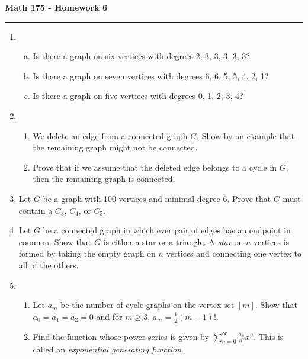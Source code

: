 \documentclass[11pt,letterpaper]{report}
\begin{document}
\begin{center}
{\bf \Large Math 175 - Homework 6}
\vspace{0.2cm}
\hrule
\end{center}

\begin{enumerate}
	\item \begin{enumerate}[(a)]
		\item Is there a graph on six vertices with degrees 2, 3, 3, 3, 3, 3?
		\item Is there a graph on seven vertices with degrees 6, 6, 5, 5, 4, 2, 1?
		\item Is there a graph on five vertices with degrees 0, 1, 2, 3, 4?
	\end{enumerate}

	\vfill

	\item \begin{enumerate}
		\item We delete an edge from a connected graph $G$. Show by an example that the remaining graph might not be connected.
		\item Prove that if we assume that the deleted edge belongs to a cycle in $G$, then the remaining graph is connected.
	\end{enumerate}
	\vfill

	\item Let $G$ be a graph with 100 vertices and minimal degree 6. Prove that $G$ must contain a $C_3$, $C_4$, or $C_5$. 
	\vfill

	\item Let $G$ be a connected graph in which ever pair of edges has an endpoint in common. Show that $G$ is either a star or a triangle. A \textit{star} on $n$ vertices is formed by taking the empty graph on $n$ vertices and connecting one vertex to all of the others.
	\vfill

	\item \begin{enumerate}
		\item Let $a_m$ be the number of cycle graphs on the vertex set $[m]$. Show that $a_0 = a_1 = a_2 = 0$ and for $m\geq 3$, $a_m = \frac{1}{2}(m-1)!$.
		\item Find the function whose power series is given by $\sum_{n=0}^\infty \frac{a_n}{n!}x^n$. This is called an \textit{exponential generating function}. 
	\end{enumerate}

	\vfill
\end{enumerate}
\end{document}
